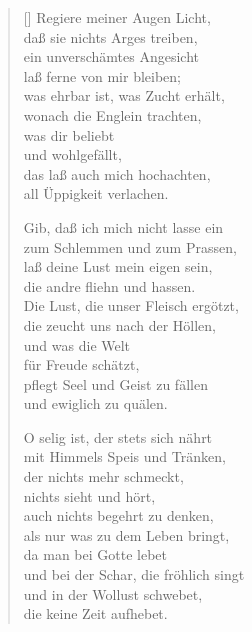\begin{multicols}{2}
\begin{verse}[\versewidth]
 Regiere meiner Augen Licht,\\
daß sie nichts Arges treiben,\\
ein unverschämtes Angesicht\\
laß ferne von mir bleiben;\\
was ehrbar ist, was Zucht erhält,\\
wonach die Englein trachten,\\
was dir beliebt\\
und wohlgefällt,\\
das laß auch mich hochachten,\\
all Üppigkeit verlachen.

 Gib, daß ich mich nicht lasse ein\\
zum Schlemmen und zum Prassen,\\
laß deine Lust mein eigen sein,\\
die andre fliehn und hassen.\\
Die Lust, die unser Fleisch ergötzt,\\
die zeucht uns nach der Höllen,\\
und was die Welt\\
für Freude schätzt,\\
pflegt Seel und Geist zu fällen\\
und ewiglich zu quälen.

 O selig ist, der stets sich nährt\\
mit Himmels Speis und Tränken,\\
der nichts mehr schmeckt,\\
nichts sieht und hört,\\
auch nichts begehrt zu denken,\\
als nur was zu dem Leben bringt,\\
da man bei Gotte lebet\\
und bei der Schar, die fröhlich singt\\
und in der Wollust schwebet,\\
die keine Zeit aufhebet.

\end{verse}
\end{multicols}

